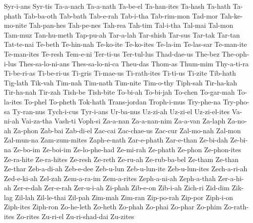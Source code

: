 {  Syr-i-ans Syr-tis Ta-a-nach Ta-a-nath Ta-be-el Ta-han-ites
  Ta-hash Ta-hath Ta-phath Tab-ba-oth Tab-bath Tab-e-rah
  Tab-i-tha Tab-rim-mon Tad-mor Tah-ke-mo-nite Tah-pan-hes Tah-pe-nes
  Tah-rea Tah-tim Tal-i-tha Tal-mai Tal-mon Tam-muz
  Tan-hu-meth Tap-pu-ah Tar-a-lah Tar-shish Tar-sus Tar-tak
  Tar-tan Tat-te-nai Te-beth Te-hin-nah Te-ko-ite Te-ko-ites
  Te-la-im Te-las-sar Te-man-ite Te-man-ites Te-resh Tem-e-ni
  Ter-ti-us Ter-tul-lus Thad-dae-us The-bez The-oph-i-lus Thes-sa-lo-ni-ans
  Thes-sa-lo-ni-ca Theu-das Thom-as Thum-mim Thy-a-ti-ra Ti-be-ri-as
  Ti-be-ri-us Ti-gris Ti-mae-us Ti-rath-ites Ti-ti-us Ti-zite
  Tib-hath Tig-lath Tik-vah Tim-nah Tim-nath Tim-nite
  Tim-o-thy Tiph-sah Tir-ha-kah Tir-ha-nah Tir-zah Tish-be
  Tish-bite To-bi-ah To-bi-jah To-chen To-gar-mah To-la-ites
  To-phel To-pheth Tok-hath Trans-jordan Troph-i-mus Try-phe-na
  Try-pho-sa Ty-ran-nus Tych-i-cus Tyr-i-ans Ur-ba-nus Uz-zi-ah
  Uz-zi-el Uz-zi-el-ites Va-ni-ah Vai-za-tha Vash-ti Voph-si
  Za-a-nan Za-a-nan-nim Za-a-van Za-laph Za-no-ah Za-phon
  Zab-bai Zab-di-el Zac-cai Zac-chae-us Zac-cur Zal-mo-nah
  Zal-mon Zal-mun-na Zam-zum-mites Zaph-e-nath Zar-e-phath Zar-e-than
  Ze-bi-dah Ze-bi-na Ze-bo-im Ze-boi-im Ze-lo-phe-had Ze-mi-rah
  Ze-phath Ze-phon Ze-phon-ites Ze-ra-hite Ze-ra-hites Ze-resh
  Ze-reth Ze-ru-ah Ze-rub-ba-bel Ze-tham Ze-than Ze-thar
  Zeb-a-di-ah Zeb-e-dee Zeb-u-lun Zeb-u-lun-ite Zeb-u-lun-ites Zech-a-ri-ah
  Zed-e-ki-ah Zel-zah Zem-a-ra-im Zem-a-rites Zeph-a-ni-ah Zeph-a-thah
  Zer-a-hi-ah Zer-e-dah Zer-e-rah Zer-u-i-ah Zi-phah Zib-e-on
  Zib-i-ah Zich-ri Zid-dim Zik-lag Zil-lah Zil-le-thai
  Zil-pah Zim-mah Zim-ran Zip-po-rah Zip-por Ziph-i-on
  Ziph-ites Ziph-ron Zo-he-leth Zo-heth Zo-phah Zo-phai
  Zo-phar Zo-phim Zo-rath-ites Zo-rites Zu-ri-el Zu-ri-shad-dai
  Zu-zites
}
\fi
